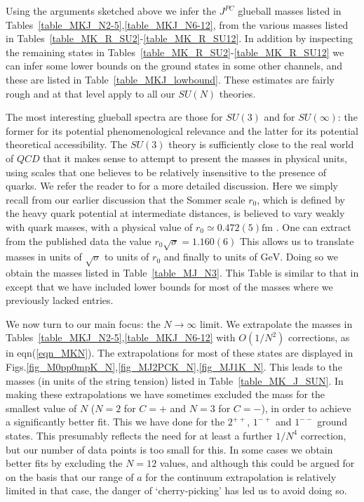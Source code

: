 \documentclass[12pt]{article}
\begin{document}
Using the arguments sketched above we infer the $J^{PC}$ glueball masses
listed in Tables~\ref{table_MKJ_N2-5},\ref{table_MKJ_N6-12}, from the
various masses listed in Tables~\ref{table_MK_R_SU2}-\ref{table_MK_R_SU12}.
In addition by inspecting the remaining states in
Tables~\ref{table_MK_R_SU2}-\ref{table_MK_R_SU12} we can infer some
lower bounds on the ground states in some other channels, and these
are listed in Table~\ref{table_MKJ_lowbound}. These estimates are
fairly rough and at that level apply to all our $SU(N)$ theories.


The most interesting glueball spectra are those for $SU(3)$ and for $SU(\infty)$:
the former for its potential phenomenological relevance and the latter for
its potential theoretical accessibility. 
The $SU(3)$ theory is sufficiently close to the real world of $QCD$ that it makes
sense to attempt to present the masses in physical units, using scales that
one believes to be relatively insensitive to the presence of quarks. We refer the
reader to
\cite{AAMT-2020}
for a more detailed discussion. Here we simply recall from our earlier discussion
that the Sommer scale $r_0$,
which is defined by the heavy quark potential at intermediate distances, is
believed to vary weakly with quark masses, with a physical value of
$r_0 \simeq 0.472(5)\mathrm{fm}$
%
\cite{Sommer-r0b}.
%
One can extract from the published data the value $r_0\surd\sigma=1.160(6)$
%
\cite{AAMT-2020}
%
This allows us to translate masses in units of $\surd\sigma$ to units of $r_0$
and finally to units of $\mathrm{GeV}$. Doing so we obtain the masses listed in
Table~\ref{table_MJ_N3}. This Table is similar to that in
%
\cite{AAMT-2020}
%
except that we have included lower bounds for most of the masses where
we previously lacked entries. 

We now turn to our main focus: the $N\to\infty$ limit.
We extrapolate the masses in Tables~\ref{table_MKJ_N2-5},\ref{table_MKJ_N6-12}
with $O(1/N^2)$ corrections, as in eqn(\ref{eqn_MKN}).
The extrapolations for most of these states are displayed
in Figs.\ref{fig_M0pp0mpK_N},\ref{fig_MJ2PCK_N},\ref{fig_MJ1K_N}.
This leads to the masses (in units of the string tension) listed in
Table~\ref{table_MK_J_SUN}. In making these extrapolations we have sometimes 
excluded the mass for the smallest value of $N$ ($N=2$ for $C=+$ and $N=3$ for $C=-$),
in order to achieve a significantly better fit. This we have done for the $2^{++}$,
$1^{-+}$ and $1^{--}$ ground states. This presumably reflects the need for at
least a further $1/N^4$ correction, but our number of data points is too small
for this. In some cases we obtain better fits by excluding the $N=12$ values,
and although this could be argued for on the basis that our range of $a$ for the
continuum extrapolation is relatively limited in that case, the danger of
`cherry-picking' has led us to avoid doing so.
\end{document}
